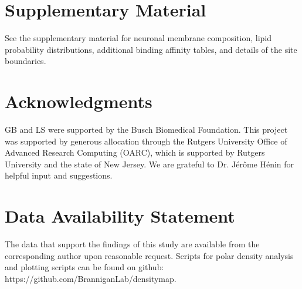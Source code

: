 \documentclass[%
 aip,
 amsmath,amssymb,
 preprint,%
]{revtex4-1}\usepackage{setspace}
\newcommand{\nachr}{nAChR}
\begin{document}

\section*{Supplementary Material}

See the supplementary material for neuronal membrane composition, lipid probability distributions, additional binding affinity tables, and details of the site boundaries. 

\section*{Acknowledgments}
GB and LS were supported by the Busch Biomedical Foundation. This project was supported by generous allocation through the Rutgers University Office of Advanced Research Computing (OARC), which is supported by Rutgers University and the state of New Jersey. We are grateful to Dr. J{\'{e}}r{\^{o}}me H{\'{e}}nin for helpful input and suggestions.

\section*{Data Availability Statement}
The data that support the findings of this study are available from the corresponding author upon reasonable request. Scripts for polar density analysis and plotting scripts can be found on github: https://github.com/BranniganLab/densitymap. 
\end{document}
